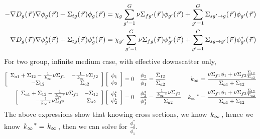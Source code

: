 \documentclass{school-22.211-notes}
\begin{document}
\clearpage
{}
\begin{align}
- \nabla D_g (\left.\vec{r}\right.) \nabla \phi_g(\left.\vec{r}\right.) + \Sigma_{tg} (\left.\vec{r}\right.) \phi_g(\left.\vec{r}\right.) &= \chi_g \displaystyle\sum_{g'=1}^G \nu \Sigma_{fg'} (\left.\vec{r}\right.) \phi_{g'}(\left.\vec{r}\right.) + \displaystyle\sum_{g'=1}^G \Sigma_{sg'\to g} (\left.\vec{r}\right.) \phi_{g'}(\left.\vec{r}\right.) \\
 \nabla D_g (\left.\vec{r}\right.) \nabla \phi_g^* (\left.\vec{r}\right.) + \Sigma_{tg} (\left.\vec{r}\right.) \phi_g^* (\left.\vec{r}\right.) &= \chi_{g'} \displaystyle\sum_{g'=1}^G \nu \Sigma_{fg} (\left.\vec{r}\right.) \phi_{g'}^* (\left.\vec{r}\right.) + \displaystyle\sum_{g'=1}^G \Sigma_{sg\to g'} (\left.\vec{r}\right.) \phi_{g'}^*(\left.\vec{r}\right.)
\end{align}
For two group, infinite medium case, with effective downscatter only, 
\begin{align}
\left[ \begin{array}{cc}
\Sigma_{a1} + \Sigma_{12} - \frac{1}{\left. k_{\infty} \right.} \nu \Sigma_{f1} & - \frac{1}{\left. k_{\infty} \right.} \nu \Sigma_{f2} \\
- \Sigma_{12} & \Sigma_{a2} \end{array} \right] 
\left[ \begin{array}{c}
\phi_1 \\ \phi_2 \end{array} \right] &= 0  
&\frac{\phi_2}{\phi_1} &= \frac{\Sigma_{12}}{\Sigma_{a2}}  
&\left. k_{\infty} \right. &= \frac{\nu \Sigma_{f1} \phi_1 + \nu \Sigma_{f2} \frac{\Sigma_{12}}{\Sigma_{a2}} }{\Sigma_{a1} + \Sigma_{12}}   \\
\left[ \begin{array}{cc}
\Sigma_{a1} + \Sigma_{12} - \frac{1}{\left. k_{\infty} \right.^*} \nu \Sigma_{f1} & - \Sigma_{12} \\
- \frac{1}{\left. k_{\infty} \right.^*} \nu \Sigma_{f2} & \Sigma_{a2} \end{array} \right] 
\left[ \begin{array}{c}
\phi_1^* \\ \phi_2^* \end{array} \right] &= 0  
&\frac{\phi_2^*}{\phi_1^*} &= \frac{\frac{1}{\left. k_{\infty} \right.^*} \nu \Sigma_{f2}}{\Sigma_{a2}}  
&\left. k_{\infty} \right.^* &= \frac{\nu \Sigma_{f1} \phi_1 + \nu \Sigma_{f2} \frac{\Sigma_{12}}{\Sigma_{a2}} }{\Sigma_{a1} + \Sigma_{12}} 
\end{align}
The above expressions show that knowing cross sections, we know $\left. k_{\infty} \right.$, hence we know $\left. k_{\infty} \right.^* = \left. k_{\infty} \right.$, then we can solve for $\frac{\phi_2^*}{\phi_1^*}$. 
\end{document}
